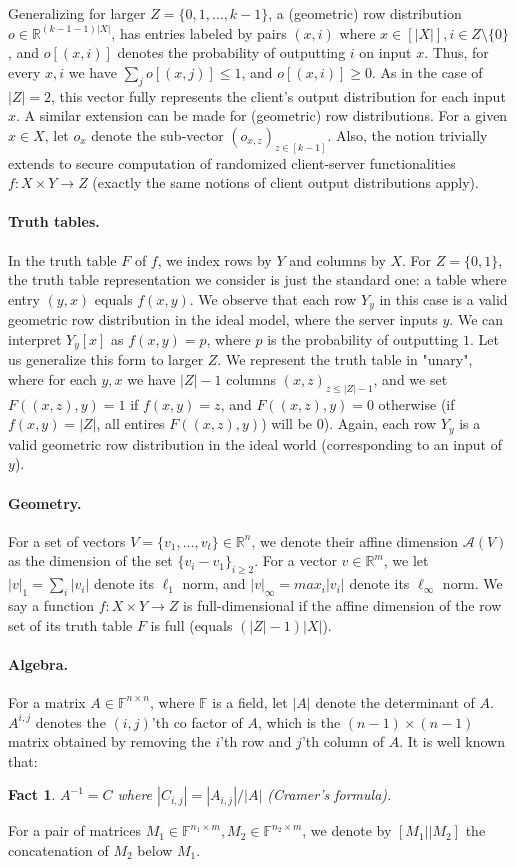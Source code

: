 \documentclass[a4paper]{article}
\newtheorem{fact}{Fact}
\newcommand{\F}{\mathbb{F}}
\newcommand{\R}{\mathbb{R}}
\newcommand{\affine}[1]{\mathcal{A}(#1)}
\begin{document}
Generalizing for larger $Z=\{0,1,\ldots,k-1\}$, a (geometric) row distribution $o\in \mathbb{R}^{(k-1-1)|X|}$, has entries labeled by
pairs $(x,i)$ where $x\in [|X|],i\in Z\setminus{\{0\}}$, and $o[(x,i)]$ denotes the probability of outputting $i$ on input $x$. Thus, for every $x,i$ we have $\sum_j o[(x,j)]\leq 1$, and $o[(x,i)]\geq 0$.
As in the case of $|Z|=2$, this vector fully represents the client's output distribution for each input $x$. A similar extension can be made for (geometric) row distributions. For a given $x\in X$, let $o_x$ denote the sub-vector $(o_{x,z})_{z\in [k-1]}$.
Also, the notion trivially extends to secure computation of randomized client-server functionalities $f:X\times Y\rightarrow Z$ (exactly the same notions of client output distributions apply).

\paragraph{Truth tables.} In the truth table $F$ of $f$, we index rows by $Y$ and columns by $X$. For $Z=\{0,1\}$, the truth table representation we consider is just the standard one: a table where entry $(y,x)$ equals $f(x,y)$.
We observe that each row $Y_y$ in this case is a valid geometric row distribution in the ideal model, where the server inputs $y$. We can interpret $Y_y[x]$ as $f(x,y) = p$, where $p$ is the probability of outputting $1$. Let us generalize this form to larger $Z$. We represent the truth table in "unary", where for each $y,x$ we have $|Z|-1$ columns $(x,z)_{z\leq |Z|-1}$, and we set $F((x,z),y)=1$
if $f(x,y)=z$, and $F((x,z),y)=0$ otherwise (if $f(x,y)=|Z|$, all entires $F((x,z),y)$) will be $0$).
Again, each row $Y_y$ is a valid geometric row distribution in the ideal world (corresponding to an input of $y$).

\paragraph{Geometry.} For a set of vectors $V=\{v_1,\ldots,v_t\}\in\R^n$, we denote their affine dimension $\affine{V}$ as the dimension of the set
$\{v_i-v_1\}_{i\geq 2}$. For a vector $v\in \R^m$, 
we let $|v|_1=\sum_i|v_i|$ denote its $\ell_1$ norm, and $|v|_\infty=max_i |v_i|$ denote its $\ell_\infty$ norm.
We say a function $f:X\times Y\rightarrow Z$ is full-dimensional if the affine dimension of the row set of its truth table $F$ is full (equals $(|Z|-1)|X|$).

\paragraph{Algebra.}
For a matrix $A\in \F^{n\times n}$, where $\F$ is a field, let
$|A|$ denote the determinant of $A$. $A^{i,j}$ denotes the $(i,j)$'th co factor of $A$, which is the $(n-1)\times(n-1)$ matrix obtained by removing the $i$'th row and $j$'th column of $A$.
It is well known that:
\begin{fact}\label{fact-cramer}
$A^{-1}=C$ where $|C_{i,j}|=|A_{i,j}|/|A|$
(Cramer's formula).
\end{fact}
For a pair of matrices $M_1\in \F^{n_1\times m},M_2\in \F^{n_2\times m}$, we denote by $[M_1||M_2]$ the concatenation of $M_2$ below $M_1$.
\end{document}
